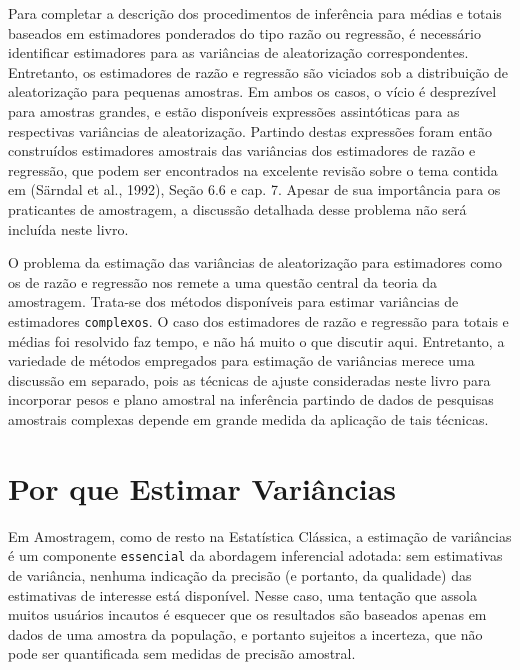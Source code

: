 \documentclass[
  12pt,
  brazilian,
]{book}
\theoremstyle{definition}
\theoremstyle{definition}
\theoremstyle{definition}
\theoremstyle{definition}
\theoremstyle{remark}
\begin{document}
Para completar a descrição dos procedimentos de inferência para médias e totais baseados em estimadores ponderados do tipo razão ou regressão, é necessário identificar estimadores para as variâncias de aleatorização correspondentes. Entretanto, os estimadores de razão e regressão são viciados sob a distribuição de aleatorização para pequenas amostras. Em ambos os casos, o vício é desprezível para amostras grandes, e estão disponíveis expressões assintóticas para as respectivas variâncias de aleatorização. Partindo destas expressões foram então construídos estimadores amostrais das variâncias dos estimadores de razão e regressão, que podem ser encontrados na excelente revisão sobre o tema contida em (Särndal et al., 1992), Seção 6.6 e cap. 7. Apesar de sua importância para os praticantes de amostragem, a discussão detalhada desse problema não será incluída neste livro.

O problema da estimação das variâncias de aleatorização para estimadores como os de razão e regressão nos remete a uma questão central da teoria da amostragem. Trata-se dos métodos disponíveis para estimar variâncias de estimadores \texttt{complexos}. O caso dos estimadores de razão e regressão para totais e médias foi resolvido faz tempo, e não há muito o que discutir aqui. Entretanto, a variedade de métodos empregados para estimação de variâncias merece uma discussão em separado, pois as técnicas de ajuste consideradas neste livro para incorporar pesos e plano amostral na inferência partindo de dados de pesquisas amostrais complexas depende em grande medida da aplicação de tais técnicas.

\hypertarget{por-que-estimar-variuxe2ncias-1}{%
\section{Por que Estimar Variâncias}\label{por-que-estimar-variuxe2ncias-1}}

Em Amostragem, como de resto na Estatística Clássica, a estimação de variâncias é um componente \texttt{essencial} da abordagem inferencial adotada: sem estimativas de variância, nenhuma indicação da precisão (e portanto, da qualidade) das estimativas
de interesse está disponível. Nesse caso, uma tentação que assola muitos usuários incautos é esquecer que os resultados são baseados apenas em dados de uma amostra da população, e portanto sujeitos a incerteza, que não pode ser quantificada sem medidas de precisão amostral.
\end{document}
